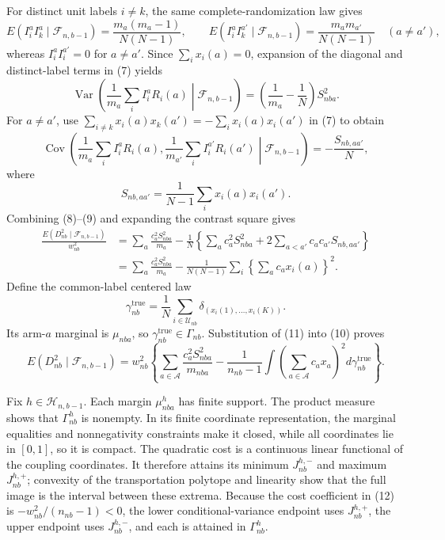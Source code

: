 For distinct unit labels \(i\ne k\), the same complete-randomization law gives
\[
E(I_i^aI_k^a\mid\mathcal F_{n,b-1})
=\frac{m_a(m_a-1)}{N(N-1)},
\qquad
E(I_i^aI_k^{a'}\mid\mathcal F_{n,b-1})
=\frac{m_am_{a'}}{N(N-1)}\quad(a\ne a'),
\tag{7}
\]
whereas \(I_i^aI_i^{a'}=0\) for \(a\ne a'\). Since \(\sum_i x_i(a)=0\), expansion of the diagonal and distinct-label terms in (7) yields
\[
\operatorname{Var}\!\left(\frac1{m_a}\sum_iI_i^aR_i(a)\middle|\mathcal F_{n,b-1}\right)
=\left(\frac1{m_a}-\frac1N\right)S_{nba}^2.
\tag{8}
\]
For \(a\ne a'\), use
\(\sum_{i\ne k}x_i(a)x_k(a')=-\sum_i x_i(a)x_i(a')\) in (7) to obtain
\[
\operatorname{Cov}\!\left(\frac1{m_a}\sum_iI_i^aR_i(a),
\frac1{m_{a'}}\sum_iI_i^{a'}R_i(a')\middle|\mathcal F_{n,b-1}\right)
=-\frac{S_{nb,aa'}}N,
\tag{9}
\]
where
\[
S_{nb,aa'}=\frac1{N-1}\sum_i x_i(a)x_i(a').
\]
Combining (8)--(9) and expanding the contrast square gives
\[
\begin{aligned}
\frac{E(D_{nb}^2\mid\mathcal F_{n,b-1})}{w_{nb}^2}
&=\sum_a\frac{c_a^2S_{nba}^2}{m_a}
-\frac1N\left\{\sum_ac_a^2S_{nba}^2+2\sum_{a<a'}c_ac_{a'}S_{nb,aa'}\right\}\\
&=\sum_a\frac{c_a^2S_{nba}^2}{m_a}
-\frac1{N(N-1)}\sum_i\left\{\sum_ac_ax_i(a)\right\}^2.
\end{aligned}
\tag{10}
\]
Define the common-label centered law
\[
\gamma_{nb}^{\mathrm{true}}
=\frac1N\sum_{i\in\mathcal U_{nb}}
\delta_{(x_i(1),\ldots,x_i(K))}.
\tag{11}
\]
Its arm-\(a\) marginal is \(\mu_{nba}\), so \(\gamma_{nb}^{\mathrm{true}}\in\Gamma_{nb}\). Substitution of (11) into (10) proves
\[
E(D_{nb}^2\mid\mathcal F_{n,b-1})
=w_{nb}^2\left\{\sum_{a\in\mathcal A}\frac{c_a^2S_{nba}^2}{m_{nba}}
-\frac1{n_{nb}-1}\int\left(\sum_{a\in\mathcal A}c_ax_a\right)^2d\gamma_{nb}^{\mathrm{true}}\right\}.
\tag{12}
\]

Fix \(h\in\mathcal H_{n,b-1}\). Each margin \(\mu_{nba}^h\) has finite support. The product measure shows that \(\Gamma_{nb}^h\) is nonempty. In its finite coordinate representation, the marginal equalities and nonnegativity constraints make it closed, while all coordinates lie in \([0,1]\), so it is compact. The quadratic cost is a continuous linear functional of the coupling coordinates. It therefore attains its minimum \(J_{nb}^{h,-}\) and maximum \(J_{nb}^{h,+}\); convexity of the transportation polytope and linearity show that the full image is the interval between these extrema. Because the cost coefficient in (12) is \(-w_{nb}^2/(n_{nb}-1)<0\), the lower conditional-variance endpoint uses \(J_{nb}^{h,+}\), the upper endpoint uses \(J_{nb}^{h,-}\), and each is attained in \(\Gamma_{nb}^h\).

